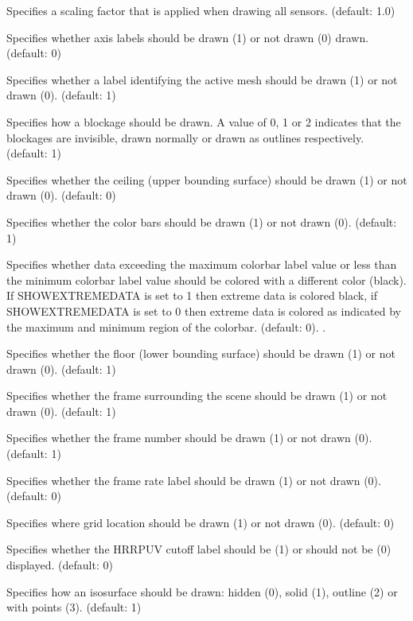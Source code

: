 \documentclass[11pt,twoside]{book}
\newcommand{\hitem}[1]{\item[{\bf #1} \hfill]}
\begin{document}
\hitem{SENSORRELSIZE} Specifies a scaling factor that is applied when
drawing all sensors.  (default: 1.0)

\hitem{SHOWAXISLABELS} Specifies whether axis labels should
be drawn (1) or not drawn (0) drawn. (default: 0)

\hitem{SHOWBLOCKLABEL} Specifies whether a label identifying the
active mesh should be drawn (1) or not drawn (0). (default: 1)

\hitem{SHOWBLOCKS}Specifies how a blockage should
be drawn.  A value of 0, 1 or 2 indicates that the blockages are
invisible, drawn normally or drawn as outlines respectively.  (default: 1)

\hitem{SHOWCADANDGRID}

\hitem{SHOWCEILING}Specifies whether
the ceiling (upper bounding surface) should be drawn (1) or not drawn (0).
(default: 0)


\hitem{SHOWCOLORBARS}Specifies whether
the color bars should be drawn (1) or not drawn (0).
(default: 1)

\hitem{SHOWEXTREMEDATA}Specifies whether data exceeding the maximum colorbar
label value or less than the minimum colorbar label value should be colored
with a different color (black).  If SHOWEXTREMEDATA is set to 1 then extreme
data is colored black, if SHOWEXTREMEDATA is set to 0 then extreme data is
colored as indicated by the maximum and minimum region of the colorbar. (default: 0).  .

\hitem{SHOWFLOOR}Specifies whether
the floor (lower bounding surface) should be drawn (1) or not drawn
(0).
(default: 1)

\hitem{SHOWFRAME} Specifies whether the frame surrounding
the scene should be drawn (1) or not drawn (0). (default:
1)

\hitem{SHOWFRAMELABEL} Specifies whether the frame number
should be drawn (1) or not drawn (0). (default: 1)

\hitem{SHOWFRAMERATE}Specifies whether
the frame rate label should be drawn (1) or not drawn (0).
(default: 0)

\hitem{SHOWGRIDLOC} Specifies where grid location should be drawn (1) or not
drawn (0). (default: 0)

\hitem{SHOWHRRCUTOFF}Specifies whether the HRRPUV cutoff label should be (1)
or should not be (0) displayed. (default: 0)

\hitem{SHOWISO}Specifies how an isosurface should be drawn: hidden (0),
solid (1), outline (2) or with points (3).  (default: 1)
\end{document}
